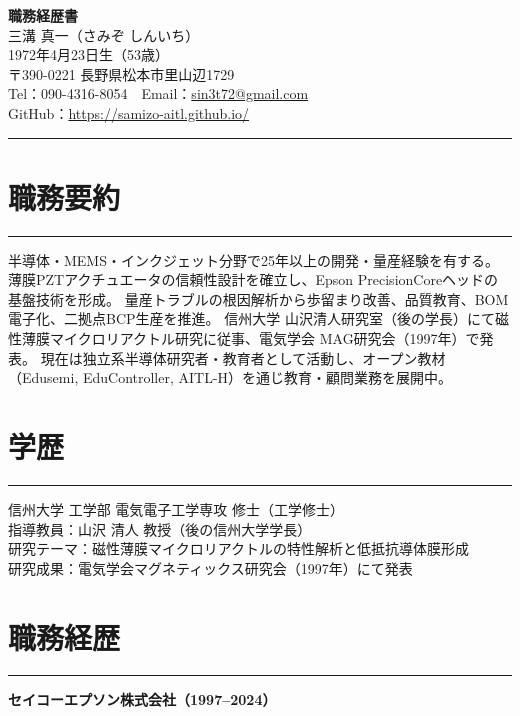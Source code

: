 \documentclass[lualatex,ja=standard,11pt]{bxjsarticle}
\newcommand{\cvsection}[1]{\section*{#1}\vspace{-0.3em}\hrule\vspace{0.5em}}
\begin{document}
\begin{center}
{\Huge \textbf{職務経歴書}} \\[1.2em]
{\Large 三溝 真一（さみぞ しんいち）} \\[0.5em]
1972年4月23日生（53歳） \\[0.3em]
〒390-0221 長野県松本市里山辺1729 \\[0.3em]
Tel：090-4316-8054　Email：\href{mailto:sin3t72@gmail.com}{sin3t72@gmail.com} \\[0.3em]
GitHub：\href{https://samizo-aitl.github.io/}{https://samizo-aitl.github.io/}
\end{center}

\vspace{1em}
\hrule
\vspace{1em}

\cvsection{職務要約}
半導体・MEMS・インクジェット分野で25年以上の開発・量産経験を有する。  
薄膜PZTアクチュエータの信頼性設計を確立し、Epson PrecisionCoreヘッドの基盤技術を形成。  
量産トラブルの根因解析から歩留まり改善、品質教育、BOM電子化、二拠点BCP生産を推進。  
信州大学 山沢清人研究室（後の学長）にて磁性薄膜マイクロリアクトル研究に従事、電気学会 MAG研究会（1997年）で発表。  
現在は独立系半導体研究者・教育者として活動し、オープン教材（Edusemi, EduController, AITL-H）を通じ教育・顧問業務を展開中。

\cvsection{学歴}
信州大学 工学部 電気電子工学専攻 修士（工学修士）\\
指導教員：山沢 清人 教授（後の信州大学学長）\\
研究テーマ：磁性薄膜マイクロリアクトルの特性解析と低抵抗導体膜形成\\
研究成果：電気学会マグネティックス研究会（1997年）にて発表

\cvsection{職務経歴}
\textbf{セイコーエプソン株式会社（1997–2024）}
\end{document}
